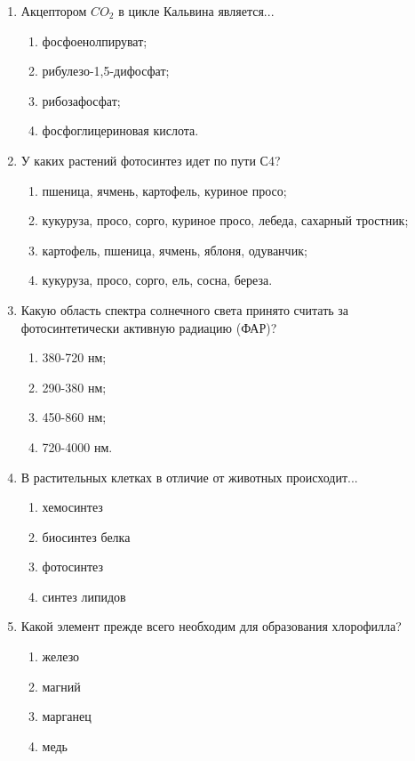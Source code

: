 \begin{enumerate}
\item Акцептором $CO_{2}$ в цикле Кальвина является...
\begin{enumerate}
	\item фосфоенолпируват; 
	\item рибулезо-1,5-дифосфат; 
	\item рибозафосфат; 
	\item фосфоглицериновая кислота.
\end{enumerate}

\item У каких растений фотосинтез идет по пути С4?
\begin{enumerate}
	\item пшеница, ячмень, картофель, куриное просо; 
	\item кукуруза, просо, сорго, куриное просо, лебеда, сахарный тростник; 
	\item картофель, пшеница, ячмень, яблоня, одуванчик; 
	\item кукуруза, просо, сорго, ель, сосна, береза.
\end{enumerate}

\item Какую область спектра солнечного света принято считать за фотосинтетически активную радиацию (ФАР)? 
\begin{enumerate}
	\item 380-720 нм;  
	\item 290-380 нм; 
	\item 450-860 нм;  
	\item 720-4000 нм.
\end{enumerate}

\item В растительных клетках в отличие от животных происходит...
\begin{enumerate}
	\item хемосинтез        
	\item биосинтез белка
	\item фотосинтез       
	\item синтез липидов
\end{enumerate}

\item Какой элемент прежде всего необходим для образования хлорофилла?
\begin{enumerate}
	\item железо           
	\item магний
	\item марганец       
	\item медь
\end{enumerate}


\end{enumerate}
